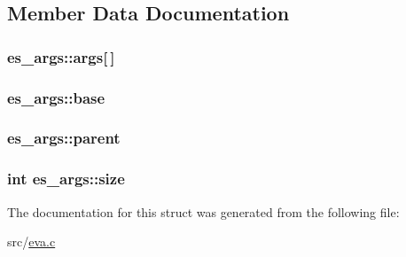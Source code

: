 \subsection{Member Data Documentation}
\hypertarget{structes__args_ab00fbef88ba6cd8f02a3a0a0804b948b}{
\subsubsection[{args}]{ es\-\_\-args\-::args\mbox{[}$\,$\mbox{]}}}\label{structes__args_ab00fbef88ba6cd8f02a3a0a0804b948b}
\hypertarget{structes__args_a07f1719a134aed2ce51c9b38e1295efe}{
\subsubsection[{base}]{ es\-\_\-args\-::base}}\label{structes__args_a07f1719a134aed2ce51c9b38e1295efe}
\hypertarget{structes__args_acefc4ac9da7592e3067f7def315177d7}{
\subsubsection[{parent}]{ es\-\_\-args\-::parent}}\label{structes__args_acefc4ac9da7592e3067f7def315177d7}
\hypertarget{structes__args_a75f7fc453b304c39c11cb2f8518acce5}{
\subsubsection[{size}]{\setlength{\rightskip}{0pt plus 5cm}int es\-\_\-args\-::size}}\label{structes__args_a75f7fc453b304c39c11cb2f8518acce5}


The documentation for this struct was generated from the following file\-:\begin{DoxyCompactItemize}
\item 
src/\hyperlink{eva_8c}{eva.\-c}\end{DoxyCompactItemize}
